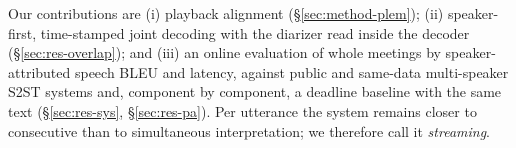 Our contributions are (i) playback alignment (\S\ref{sec:method-plem}); (ii) speaker-first, time-stamped joint
decoding with the diarizer read inside the decoder (\S\ref{sec:res-overlap}); and (iii) an online evaluation of whole
meetings by speaker-attributed speech BLEU and latency, against public and same-data multi-speaker S2ST systems and,
component by component, a deadline baseline with the same text (\S\ref{sec:res-sys}, \S\ref{sec:res-pa}). Per utterance the
system remains closer to consecutive than to simultaneous interpretation; we therefore call it \emph{streaming}.

